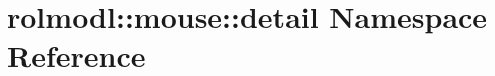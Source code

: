 \hypertarget{namespacerolmodl_1_1mouse_1_1detail}{}\section{rolmodl\+::mouse\+::detail Namespace Reference}
\label{namespacerolmodl_1_1mouse_1_1detail}
